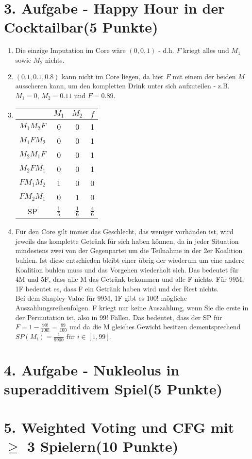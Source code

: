 \documentclass[a4paper, 11pt]{article}
\begin{document}
\section*{3. Aufgabe - Happy Hour in der Cocktailbar\hfill {\small (5 Punkte)}}
\begin{enumerate}
\item
Die einzige Imputation im Core wäre $(0,0,1)$ - d.h. $F$ kriegt alles und $M_1$ sowie $M_2$ nichts.
\item 
$(0.1,0.1,0.8)$ kann nicht im Core liegen, da hier $F$ mit einem der beiden $M$ ausscheren kann, um den kompletten Drink unter sich aufzuteilen - z.B. $M_1 = 0$, $M_2 =0.11$ und $F=0.89$.
\item
\begin{tabular}{c || c c c}
& $M_1$ & $M_2$ & $f$ \\ \hline
$M_1M_2F$ & 0 & 0 & 1 \\
$M_1FM_2 $ & 0 & 0 & 1 \\
$M_2M_1F$ & 0 & 0 & 1 \\
$M_2FM_1$ & 0 & 0 & 1 \\
$FM_1M_2$ & 1 & 0 & 0 \\
$FM_2M_1$ & 0 & 1 & 0 \\
SP & $\frac{1}{6}$ & $\frac{1}{6}$ & $\frac{4}{6}$ \\
\end{tabular}
\item
Für den Core gilt immer das Geschlecht, das weniger vorhanden ist, wird jeweils das komplette Getränk für sich haben können, da in jeder Situation mindestens zwei von der Gegenpartei um die Teilnahme in der 2er Koalition buhlen. Ist diese entschieden bleibt einer übrig der wiederum um eine andere Koalition buhlen muss und das Vorgehen wiederholt sich. Das bedeutet für 4M und 5F, dass alle M das Getränk bekommen und alle F nichts. Für 99M, 1F bedeutet es, dass F ein Getränk haben wird und der Rest nichts.\\

Bei dem Shapley-Value für 99M, 1F gibt es $100!$ mögliche Auszahlungsreihenfolgen. F kriegt nur keine Auszahlung, wenn Sie die erste in der Permutation ist, also in $99!$ Fällen. Das bedeutet, dass der SP für $F = 1 - \frac{99!}{100!} = \frac{99}{100}$ und da die M gleiches Gewicht besitzen dementsprechend $SP(M_i) = \frac{1}{9900}$ für $i \in [1,99]$.\\




\end{enumerate}

\section*{4. Aufgabe - Nukleolus in superadditivem Spiel\hfill {\small (5 Punkte)}}


\section*{5. Weighted Voting und CFG mit $\geq$ 3 Spielern\hfill {\small (10 Punkte)}}
\end{document}
